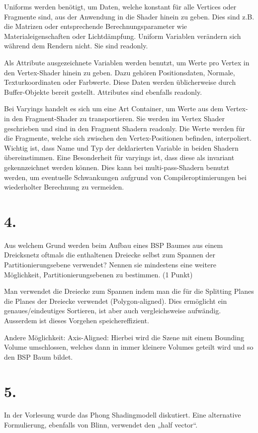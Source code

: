 \documentclass[12pt]{scrreprt}
\begin{document}
Uniforms werden benötigt, um Daten, welche konstant für alle Vertices oder Fragmente sind, aus der Anwendung in die Shader hinein zu geben. Dies sind z.B. die Matrizen oder entsprechende Berechnungsparameter wie Materialeigenschaften oder Lichtdämpfung. Uniform Variablen verändern sich während dem Rendern nicht. Sie sind readonly.


Als Attribute ausgezeichnete Variablen werden benutzt, um Werte pro Vertex in den Vertex-Shader hinein zu geben. Dazu gehören Positionsdaten, Normale, Texturkoordinaten oder Farbwerte. Diese Daten werden üblicherweise durch Buffer-Objekte bereit gestellt. Attributes sind ebenfalls readonly.

Bei Varyings handelt es sich um eine Art Container, um Werte aus dem Vertex- in den Fragment-Shader zu transportieren.
Sie werden im Vertex Shader geschrieben und sind in den Fragment Shadern readonly.
Die Werte werden für die Fragmente, welche sich zwischen den Vertex-Positionen befinden, interpoliert.
Wichtig ist, dass Name und Typ der deklarierten Variable in beiden Shadern übereinstimmen.
Eine Besonderheit für varyings ist, dass diese als invariant gekennzeichnet werden können.
Dies kann bei multi-pass-Shadern benutzt werden, um eventuelle Schwankungen aufgrund von Compileroptimierungen bei wiederholter Berechnung zu vermeiden.


\section*{4.}
Aus welchem Grund werden beim Aufbau eines BSP Baumes aus einem Dreicksnetz oftmals die enthaltenen Dreiecke selbst zum Spannen der Partitionierungsebene verwendet? Nennen sie mindestens eine weitere Möglichkeit, Partitionierungsebenen zu bestimmen. (1 Punkt)

Man verwendet die Dreiecke zum Spannen indem man die für die Splitting Planes die Planes der Dreiecke verwendet (Polygon-aligned). Dies ermöglicht ein genaues/eindeutiges Sortieren, ist aber auch vergleichsweise aufwändig.
Ausserdem ist dieses Vorgehen speichereffizient.

Andere Möglichkeit: Axis-Aligned: Hierbei wird die Szene mit einem Bounding Volume umschlossen, welches dann in immer kleinere Volumes geteilt wird und so den BSP Baum bildet.

\section*{5.}
In der Vorlesung wurde das Phong Shadingmodell diskutiert. Eine alternative Formulierung, ebenfalls von Blinn, verwendet den „half vector“.
\end{document}
